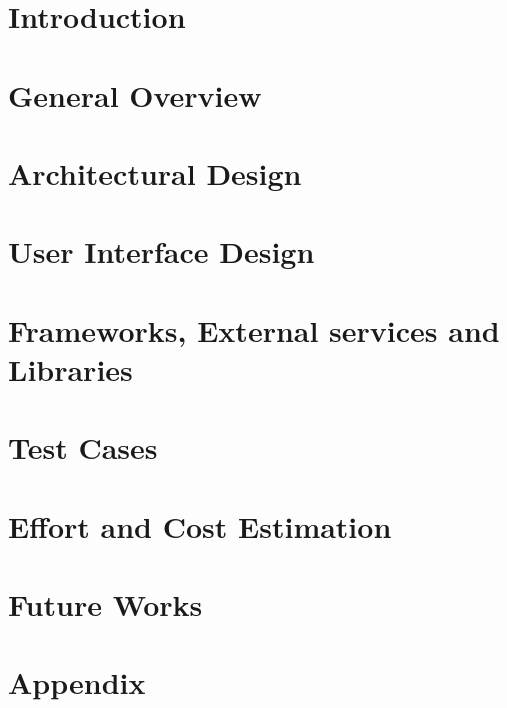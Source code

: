 \documentclass[a4paper,12pt]{report}
\begin{document}
\setcounter{tocdepth}{1}
\tableofcontents

\chapter{Introduction}

\clearpage

\chapter{General Overview}

\clearpage

\chapter{Architectural Design}

\clearpage

\chapter{User Interface Design}
\clearpage

\chapter{Frameworks, External services and Libraries}

\clearpage

\chapter{Test Cases}
\clearpage

\chapter{Effort and Cost Estimation}
\clearpage

\chapter{Future Works}

\clearpage

\appendix
\chapter{Appendix}

\clearpage
\end{document}
